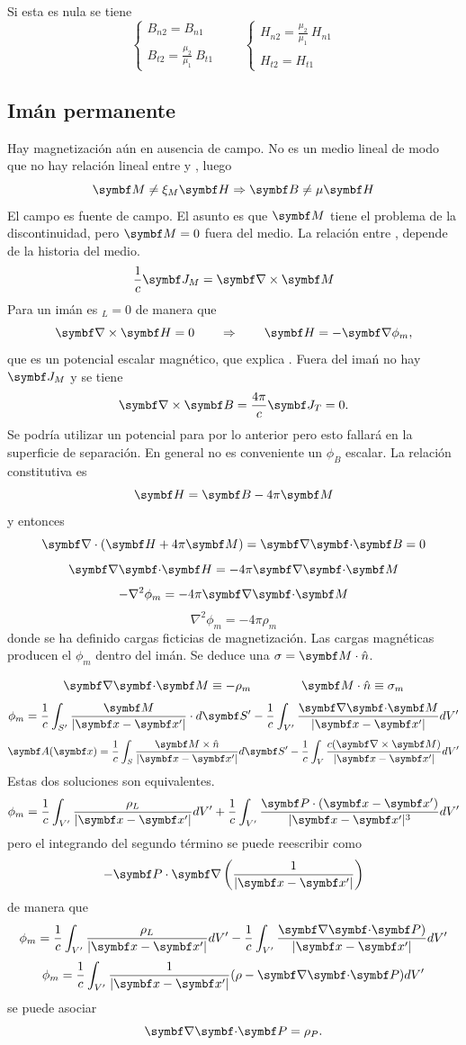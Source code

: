 \documentclass[10pt,oneside]{CBFT_book}
\begin{document}
Si esta es nula se tiene
\[
	\begin{cases}
	B_{n2} = B_{n1} \\
	\\
	\displaystyle B_{t2} = \frac{\mu_2}{\mu_1}\: B_{t1}
	\end{cases}
	\qquad 
	\begin{cases}
	\displaystyle H_{n2} = \frac{\mu_2}{\mu_1}\: H_{n1} \\
	\\
	H_{t2} = H_{t1} 
	\end{cases}
\]

\subsection{Imán permanente}

Hay magnetización  aún en ausencia de campo. No es un medio lineal de modo que
no hay relación lineal entre  y , luego
\[
	\vb{M}	 \neq \xi_M \vb{H} \Rightarrow \vb{B} \neq \mu \vb{H}
\]
El campo  es fuente de campo. El asunto es que $\vb{M}$ tiene el problema de
la discontinuidad, pero $ \vb{M} = 0 $ fuera del medio.
La relación entre ,  depende de la historia del medio.
\[
	\frac{1}{c}\vb{J}_M = \rotorm{M}
\]
Para un imán es $_L=0$ de manera que
\[
	\rotorm{H} = 0 \qquad \Rightarrow \qquad \vb{H} = -\Nabla\phi_m,
\]
que es un potencial escalar magnético, que explica .
Fuera del imań no hay $ \vb{J}_M $ y se tiene
\[
	\rotorm{B} = \frac{4\pi}{c}\vb{J}_T = 0.
\]
Se podría utilizar un potencial para  por lo anterior pero esto fallará en la
superficie de separación.
En general no es conveniente un $\phi_B$ escalar. La relación constitutiva es
\[
	\vb{H} = \vb{B} - 4\pi\vb{M}
\]
y entonces
\[
	\Nabla\cdot( \vb{H} + 4\pi\vb{M} ) = \divem{B} = 0
\]
\[
	\divem{H} = -4\pi\divem{M}
\]
\[
	-\nabla^2 \phi_m = -4\pi\divem{M}
\]
\[
	\nabla^2 \phi_m = -4\pi\rho_m
\]
donde se ha definido cargas ficticias de magnetización.
Las cargas magnéticas producen el $\phi_m$ dentro del imán.
Se deduce una $ \sigma = \vb{M} \cdot \hat{n} $.

\[
	\divem{M} \equiv -\rho_m \qquad \qquad \vb{M}\cdot\hat{n} \equiv \sigma_m
\]
\[
	\phi_m = \frac{1}{c} \int_{S'} \frac{\vb{M}}{|\vb{x}-\vb{x}'|} \cdot d\vb{S}' -
		\frac{1}{c} \int_{V'} \frac{\divem{M}}{|\vb{x}-\vb{x}'|} dV' 
\]
\[
	\vb{A}( \vb{x}) = \frac{1}{c} \int_S \frac{ \vb{M}\times\hat{n} }{|\vb{x}-\vb{x}'|} d\vb{S}' - 
		\frac{1}{c} \int_V \frac{ c(\rotorm{M}) }{|\vb{x}-\vb{x}'|}  dV'
\]
Estas dos soluciones son equivalentes.
\[
	\phi_m = \frac{1}{c} \int_{V'} \frac{\rho_L}{|\vb{x}-\vb{x}'|}  dV' +
		\frac{1}{c} \int_{V'} \frac{ \vb{P}\cdot(\vb{x}-\vb{x}')}{|\vb{x}-\vb{x}'|^3} dV' 
\]
pero el integrando del segundo término se puede reescribir como 
\[
	-\vb{P}\cdot\Nabla\left(\frac{1}{|\vb{x}-\vb{x}'|}\right)
\]
de manera que 
\[
	\phi_m = \frac{1}{c} \int_{V'} \frac{\rho_L}{|\vb{x}-\vb{x}'|}  dV' -
		\frac{1}{c} \int_{V'} \frac{ \divem{P}) }{|\vb{x}-\vb{x}'|} dV' 
\]
\[
	\phi_m = \frac{1}{c} \int_{V'} \frac{1}{|\vb{x}-\vb{x}'|}( \rho - \divem{P} )  dV'
\]
se puede asociar
\[
	\divem{P} = \rho_P.
\]
\end{document}
